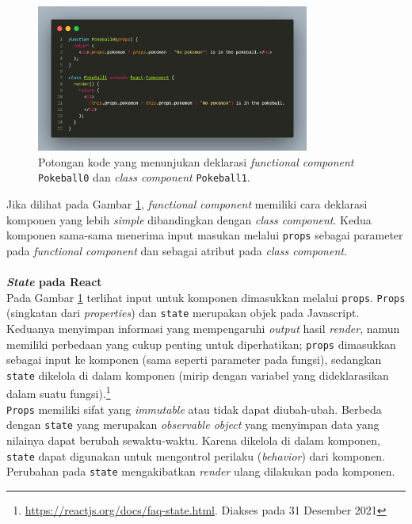 \documentclass[a4paper,twoside]{article}
\begin{document}
\begin{enumerate}
		\begin{figure}[H]
            \centering
            \includegraphics[width=0.8\textwidth]{images/code-class-func-comp.png}
            \caption{Potongan kode yang menunjukan deklarasi \textit{functional component} \texttt{Pokeball0} dan \textit{class component} \texttt{Pokeball1}.}
            \label{fig:react-code-class-func-comp}
        \end{figure}
		\setlength\parindent{24pt}
		Jika dilihat pada Gambar \ref{fig:react-code-class-func-comp}, \textit{functional component} memiliki cara deklarasi komponen yang lebih \textit{simple} dibandingkan dengan \textit{class component}. Kedua komponen sama-sama menerima input masukan melalui \texttt{props} sebagai parameter pada \textit{functional component} dan sebagai atribut pada \textit{class component}.
		\\
		\\
		\setlength\parindent{0pt}
		\textbf{\textit{State} pada React}\\
		Pada Gambar \ref{fig:react-code-class-func-comp} terlihat input untuk komponen dimasukkan melalui \texttt{props}. \texttt{Props} (singkatan dari \textit{properties}) dan \texttt{state} merupakan objek pada Javascript. Keduanya menyimpan informasi yang mempengaruhi \textit{output} hasil \textit{render}, namun memiliki perbedaan yang cukup penting untuk diperhatikan; \texttt{props} dimasukkan sebagai input ke komponen (sama seperti parameter pada fungsi), sedangkan \texttt{state} dikelola di dalam komponen (mirip dengan variabel yang dideklarasikan dalam suatu fungsi).\footnote{\url{https://reactjs.org/docs/faq-state.html}. Diakses pada 31 Desember 2021}\\
		
		\setlength\parindent{24pt}
		\texttt{Props} memiliki sifat yang \textit{immutable} atau tidak dapat diubah-ubah. Berbeda dengan \texttt{state} yang merupakan \textit{observable object} yang menyimpan data yang nilainya dapat berubah sewaktu-waktu. Karena dikelola di dalam komponen, \texttt{state} dapat digunakan untuk mengontrol perilaku (\textit{behavior}) dari komponen. Perubahan pada \texttt{state} mengakibatkan \textit{render} ulang dilakukan pada komponen. 
		

\end{enumerate}
\end{document}
